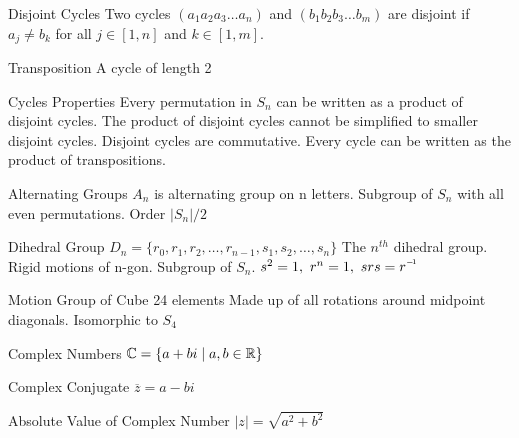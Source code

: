 \begin{flashcard}[Definition]{Disjoint Cycles}
  Two cycles $(a_1 a_2 a_3 \dots a_n)$ and $(b_1 b_2 b_3 \dots b_m)$ are disjoint if $a_j \neq b_k$ for all $j \in [1,n]$ and $k \in [1,m]$.
\end{flashcard}

\begin{flashcard}[Definition]{Transposition}
  A cycle of length 2
\end{flashcard}

\begin{flashcard}[Definition]{Cycles Properties}
  Every permutation in $S_n$ can be written as a product of disjoint cycles.
  \vfill
  The product of disjoint cycles cannot be simplified to smaller disjoint cycles.
  \vfill
  Disjoint cycles are commutative.
  \vfill
  Every cycle can be written as the product of transpositions.
\end{flashcard}

\begin{flashcard}[Definition]{Alternating Groups}
  $A_n$ is alternating group on n letters.
  \vfill
  Subgroup of $S_n$ with all even permutations.
  \vfill
  Order $|S_n|/2$
\end{flashcard}

\begin{flashcard}[Definition]{Dihedral Group}
  $D_n = \{ r_0, r_1, r_2, \dots, r_{n-1}, s_1, s_2, \dots, s_n \} $
  \vfill
  The $n^{th}$ dihedral group. Rigid motions of n-gon. Subgroup of $S_n$.
  \vfill
  $s^2 = 1, \  r^n = 1, \  srs = \inv{r}$
\end{flashcard}

\begin{flashcard}[Definition]{Motion Group of Cube}
  24 elements
  \vfill
  Made up of all rotations around midpoint diagonals.
  \vfill
  Isomorphic to $S_4$
\end{flashcard}

\begin{flashcard}[Definition]{Complex Numbers}
  $\mathbb{C} = \{ a + bi \mid a,b \in \mathbb{R} \}$
\end{flashcard}

\begin{flashcard}[Definition]{Complex Conjugate}
  $\overline{z} = a - bi$
\end{flashcard}

\begin{flashcard}[Definition]{Absolute Value of Complex Number}
  $|z| = \sqrt{a^2 + b^2}$
\end{flashcard}

